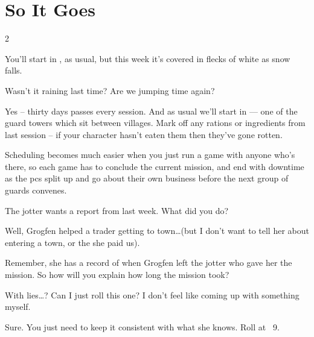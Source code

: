 \section*{So It Goes}

\begin{multicols}{2}

\begin{description}\sffamily
  \item[\Gls{gm}:] You'll start in , as usual, but this week it's covered in flecks of white as snow falls.

  \item[Player 1:] Wasn't it raining last time? Are we jumping time again?

  \item[\Gls{gm}:] Yes -- thirty days passes every session.  And as usual
  we'll start in  --- one of the \gls{guard} towers which sit
  between \glspl{village}.  Mark off any rations or \glspl{ingredient} from
  last session -- if your character hasn't eaten them then they've gone rotten.

\end{description}

\bigLine

Scheduling becomes much easier when you just run a game with anyone who's
there, so each game has to conclude the current mission, and end with
\gls{downtime} as the \glspl{pc} split up and go about their own business
before the next group of \glspl{guard} convenes.

\bigLine

\begin{description}\sffamily
  \item[\Gls{gm}:]
  The \Gls{jotter} wants a report from last week.  What did you do?

  \item[Player 2:] Well, Grogfen helped a trader getting to town\ldots (but I
  don't want to tell her about entering a town, or the  she
  paid us).

  \item[\Gls{gm}:] Remember, she has a record of when Grogfen left the
  \gls{jotter} who gave her the mission.  So how will you explain how long the
  mission took?

  \item[Player 2:] With lies\ldots?  Can I just roll this one?  I don't feel
  like coming up with something myself.

  \item[\Gls{gm}:] Sure.  You just need to keep it consistent with what she
  knows.  Roll  at ~9.


\end{description}
\end{multicols}
